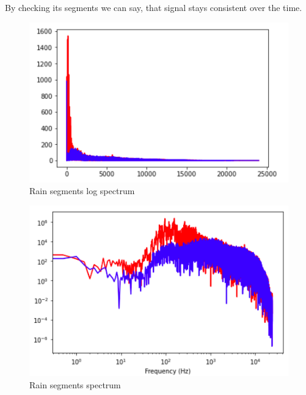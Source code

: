 \documentclass[a4paper]{article}
\begin{document}
        By checking its segments we can say, that signal stays consistent over the time.
        \begin{figure}[H]
            \centering
            \includegraphics[width=\textwidth]{img/rain_seg.png}
            \caption{Rain segments log spectrum}
            \label{fig:part1_2_3}
        \end{figure}
        \begin{figure}[H]
            \centering
            \includegraphics[width=\textwidth]{img/rain_seg_log.png}
            \caption{Rain segments spectrum}
            \label{fig:part1_2_4}
        \end{figure}
        
\end{document}
